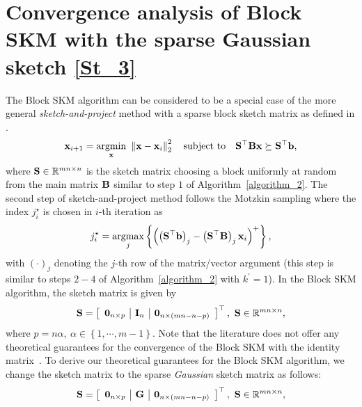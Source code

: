 \documentclass[12pt,draftcls,onecolumn]{IEEEtran}
\begin{document}
\section{Convergence analysis of Block SKM with the sparse Gaussian sketch \eqref{St_3}}
\label{A}
The Block SKM algorithm can be considered to be a special case of the more general \emph{sketch-and-project} method with a sparse block sketch matrix as defined in \cite{derezinski2022sharp}. 
\begin{equation}
\label{neg_2}
\mbx_{i+1}= \underset{\mbx}{\textrm{argmin}}~\left\|\mbx-\mbx_{i}\right\|^{2}_{2}\quad \textrm{subject to}\quad \mbS^{\top}\mbB\mbx\succeq\mbS^{\top}\mbb,
\end{equation}
where $\mathbf{S}\in\mathbb{R}^{m n\times n}$ is the sketch matrix choosing a block uniformly at random from the main matrix $\mathbf{B}$ similar to step $1$ of Algorithm~\ref{algorithm_2}. The second step of sketch-and-project method follows the Motzkin sampling where the index $j^{\star}_{i}$ is chosen in $i$-th iteration as 
\begin{equation}
j^{\star}_{i}=\underset{j}{\textrm{argmax}}\left\{ \left(\left(\mathbf{S}^{\top}\mathbf{b}\right)_{j}-\left(\mathbf{S}^{\top}\mathbf{B}\right)_{j}\mathbf{x}_{i}\right)^{+}\right\},\end{equation}
with $(\cdot)_{j}$ denoting the $j$-th row of the matrix/vector argument (this step is similar to steps $2-4$ of Algorithm~\ref{algorithm_2} with $k^{\prime}=1$).
In the Block SKM algorithm, the sketch matrix is given by
\begin{equation}
\label{St_2}
\mbS=\left[\begin{array}{c|c|c}
\mathbf{0}_{n\times p} &\mbI_{n} &\mathbf{0}_{n\times (m n-n-p)}
\end{array}\right]^{\top}, ~ \mbS\in\mathbb{R}^{m n\times n},
\end{equation}
where 
$p=n\alpha,~\alpha\in\left\{1,\cdots,m-1\right\}$. Note that the literature does not offer any theoretical guarantees for the convergence of the Block SKM with the identity matrix~\cite{rebrova2021block}. To derive our theoretical guarantees for the Block SKM algorithm,
we change the sketch matrix to the sparse \emph{Gaussian} sketch matrix as follows:
\begin{equation}
\label{St_3}
\mbS=\left[\begin{array}{c|c|c}
\mathbf{0}_{n\times p} &\mbG &\mathbf{0}_{n\times (m n-n-p)}
\end{array}\right]^{\top}, ~ \mbS\in\mathbb{R}^{m n\times n},
\end{equation}
\end{document}
